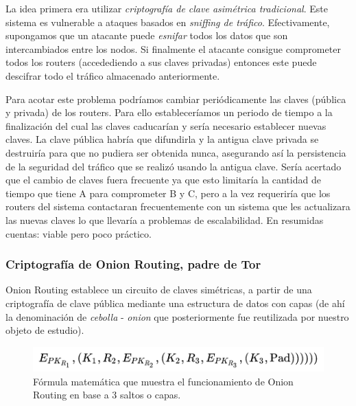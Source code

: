\documentclass[a4paper, 11pt, titlepage]{article}
\begin{document}
            La idea primera era utilizar \emph{criptografía de clave asimétrica tradicional}. Este sistema es vulnerable 
            a ataques basados en \emph{sniffing de tráfico}. Efectivamente, supongamos que un atacante puede \emph{esnifar} 
            todos los datos que son intercambiados entre los nodos. Si finalmente el atacante consigue comprometer todos 
            los routers (accedediendo a sus claves privadas) entonces este puede descifrar todo el tráfico almacenado 
            anteriormente. 

            Para acotar este problema podríamos cambiar periódicamente las claves (pública y privada) de los routers. 
            Para ello estableceríamos un periodo de tiempo a la finalización del cual las claves caducarían y sería 
            necesario establecer nuevas claves. La clave pública habría que difundirla y la antigua clave privada se 
            destruiría para que no pudiera ser obtenida nunca, asegurando así la persistencia de la seguridad del 
            tráfico que se realizó usando la antigua clave. Sería acertado que el cambio de claves fuera frecuente ya 
            que esto limitaría la cantidad de tiempo que tiene A para comprometer B y C, pero a la vez requeriría que 
            los routers del sistema contactaran frecuentemente con un sistema que les actualizara las nuevas claves lo 
            que llevaría a problemas de escalabilidad. En resumidas cuentas: viable pero poco práctico.
        
        \subsubsection{Criptografía de Onion Routing, padre de Tor}

            Onion Routing establece un circuito de claves simétricas, a partir de una criptografía de clave pública 
            mediante una estructura de datos con capas (de ahí la denominación de \emph{cebolla} - \emph{onion} que 
            posteriormente fue reutilizada por nuestro objeto de estudio).

            \begin{figure}[htp]
                \centering
                \includegraphics[scale=3.00]{resources/onionroutingcrypto.png}
                \caption{Fórmula matemática que muestra el funcionamiento de Onion Routing en base a 3 saltos o capas.}
                \label{}
            \end{figure}
\end{document}
